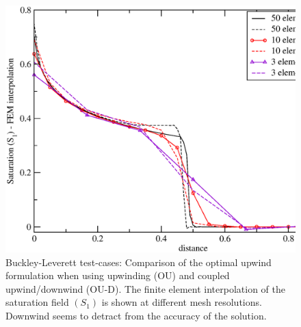 \begin{figure}[h]
\begin{center}
\includegraphics[width=1.\textwidth]{bl-upwind-v-up-and-down}
\end{center}
\caption{Buckley-Leverett test-cases: Comparison of the optimal upwind formulation when using upwinding (OU) and coupled upwind/downwind (OU-D). The finite element interpolation of the saturation field $\left(S_{1}\right)$ is shown at different mesh resolutions. Downwind seems to detract from the accuracy of the solution. \label{bl-upwind-v-up-and-down}}
\end{figure}



